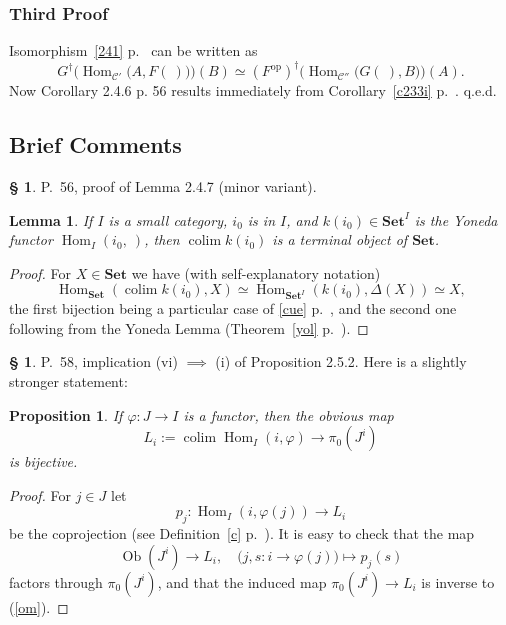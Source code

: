 \documentclass[12pt]{article}
\newtheorem{lem}[thm]{Lemma}
\newtheorem{prop}[thm]{Proposition}
\theoremstyle{remark}
\theoremstyle{definition}
\newtheorem{s}[thm]{\S}
\newcommand{\C}{\mathcal C}
\newcommand{\Set}{\mathbf{Set}}
\newcommand{\mv}{ (minor variant)}
\newcommand{\bc}{\subsection{Brief Comments}}
\DeclareMathOperator*{\coli}{colim}
\DeclareMathOperator{\Hom}{Hom}%
\DeclareMathOperator{\Ob}{Ob}
\DeclareMathOperator{\op}{op}
\begin{document}
\subsubsection{Third Proof}
%
Isomorphism~\eqref{241} p.~\pageref{241} can be written as 
$$
G^\dagger\Big(\Hom_{\C'}\big(A,F(\ )\big)\Big)(B)\simeq
(F^{\op})^\dagger\Big(\Hom_{\C''}\big(G(\ ),B\big)\Big)(A).
$$ 
Now Corollary 2.4.6 p. 56 results immediately from Corollary~\ref{c233i} p.~\pageref{c233i}. q.e.d.
%
%
\bc
%
\begin{s} 
P.~56, proof of Lemma 2.4.7\mv.
%
\begin{lem} 
If $I$ is a small category, $i_0$ is in $I$, and $k(i_0)\in\Set^I$ is the Yoneda functor $\Hom_I(i_0,\ )$, then $\coli k(i_0)$ is a terminal object of $\Set$. 
\end{lem}
%
\begin{proof}
For $X\in\Set$ we have (with self-explanatory notation)
$$
\Hom_{\Set}\left(\coli k(i_0),X\right)\simeq\Hom_{{\Set}^I}(k(i_0),\Delta(X))\simeq X,
$$
the first bijection being a particular case of \eqref{cue} p.~\pageref{cue}, and the second one following from the Yoneda Lemma (Theorem~\ref{yol} p.~\pageref{yol}).
\end{proof}
\end{s}
%
%
\begin{s} 
P.~58, implication (vi) $\implies$ (i) of Proposition 2.5.2. Here is a slightly stronger statement:
%
\begin{prop} 
If $\varphi:J\to I$ is a functor, then the obvious map
\begin{equation}\label{om}
L_i:=\coli\Hom_I(i,\varphi)\to\pi_0(J^i)
\end{equation}
is bijective. 
\end{prop}
% 
\begin{proof}
For $j\in J$ let 
$$
p_j:\Hom_I(i,\varphi(j))\to L_i
$$
be the coprojection (see Definition~\ref{c} p.~\pageref{c}). It is easy to check that the map 
$$
\Ob(J^i)\to L_i,\quad\big(j,s:i\to\varphi(j)\big)\mapsto p_j(s)
$$
factors through $\pi_0(J^i)$, and that the induced map $\pi_0(J^i)\to L_i$ is inverse to (\ref{om}).
\end{proof}
\end{s}
%
%
\end{document}
